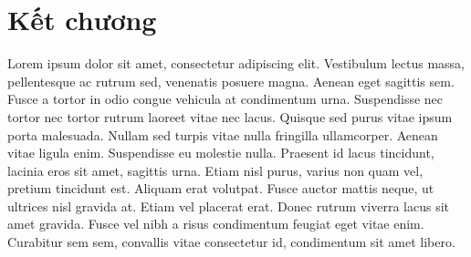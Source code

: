 \section{Kết chương}
Lorem ipsum dolor sit amet, consectetur adipiscing elit. Vestibulum lectus massa, pellentesque ac rutrum sed, venenatis posuere magna. Aenean eget sagittis sem. Fusce a tortor in odio congue vehicula at condimentum urna. Suspendisse nec tortor nec tortor rutrum laoreet vitae nec lacus. Quisque sed purus vitae ipsum porta malesuada. Nullam sed turpis vitae nulla fringilla ullamcorper. Aenean vitae ligula enim. Suspendisse eu molestie nulla. Praesent id lacus tincidunt, lacinia eros sit amet, sagittis urna. Etiam nisl purus, varius non quam vel, pretium tincidunt est. Aliquam erat volutpat. Fusce auctor mattis neque, ut ultrices nisl gravida at. Etiam vel placerat erat. Donec rutrum viverra lacus sit amet gravida. Fusce vel nibh a risus condimentum feugiat eget vitae enim. Curabitur sem sem, convallis vitae consectetur id, condimentum sit amet libero.

